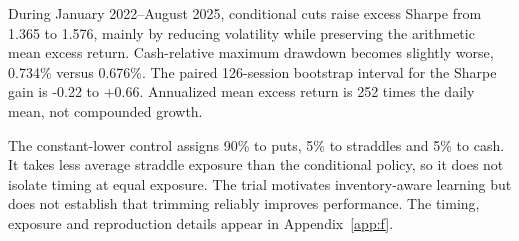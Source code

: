 During January 2022--August 2025, conditional cuts raise excess Sharpe from 1.365 to 1.576, mainly by reducing volatility while preserving the arithmetic mean excess return. Cash-relative maximum drawdown becomes slightly worse, 0.734\% versus 0.676\%. The paired 126-session bootstrap interval for the Sharpe gain is -0.22 to +0.66. Annualized mean excess return is 252 times the daily mean, not compounded growth.


The constant-lower control assigns 90\% to puts, 5\% to straddles and 5\% to cash. It takes less average straddle exposure than the conditional policy, so it does not isolate timing at equal exposure. The trial motivates inventory-aware learning but does not establish that trimming reliably improves performance. The timing, exposure and reproduction details appear in Appendix~\ref{app:f}.


\FloatBarrier

\FloatBarrier
